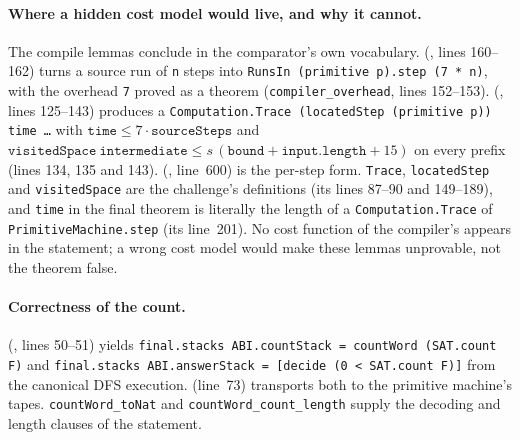 \paragraph{Where a hidden cost model would live, and why it cannot.}
The compile lemmas conclude in
the comparator's own vocabulary. 
(, lines 160--162) turns a
source run of \texttt{n} steps into \texttt{RunsIn (primitive p).step
(7 * n)}, with the overhead \texttt{7} proved as a theorem
(\texttt{compiler\_overhead}, lines 152--153).
(, lines 125--143) produces a
\texttt{Computation.Trace (locatedStep (primitive p)) time \ldots} with
$\mathtt{time} \le 7\cdot\mathtt{sourceSteps}$ and
$\mathtt{visitedSpace}\ \mathtt{intermediate} \le s\,(\mathtt{bound} + \mathtt{input.length} + 15)$ on
every prefix (lines 134, 135 and 143). 
(, line~600) is the per-step
form. \texttt{Trace}, \texttt{locatedStep} and \texttt{visitedSpace} are
the challenge's definitions (its lines 87--90 and 149--189), and
\texttt{time} in the final theorem is literally the length of a
\texttt{Computation.Trace} of \texttt{PrimitiveMachine.step} (its
line~201). No cost function of the compiler's appears in the statement;
a wrong cost model would make these lemmas unprovable, not the theorem
false.

\paragraph{Correctness of the count.} 
(, lines 50--51) yields
\texttt{final.stacks ABI.countStack = countWord (SAT.count F)} and
\texttt{final.stacks ABI.answerStack = [decide (0 < SAT.count F)]} from
the canonical DFS execution.
 (line~73) transports
both to the primitive machine's tapes. \texttt{countWord\_toNat} and
\texttt{countWord\_count\_length} supply the decoding and length clauses
of the statement.


